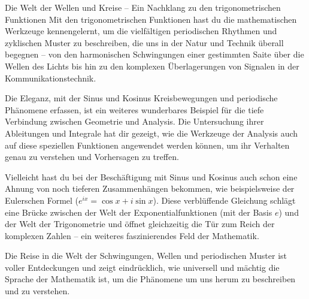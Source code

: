 \begin{infoboxumgebung}{Die Welt der Wellen und Kreise – Ein Nachklang zu den trigonometrischen Funktionen}
Mit den trigonometrischen Funktionen hast du die mathematischen Werkzeuge kennengelernt, um die vielfältigen periodischen Rhythmen und zyklischen Muster zu beschreiben, die uns in der Natur und Technik überall begegnen – von den harmonischen Schwingungen einer gestimmten Saite über die Wellen des Lichts bis hin zu den komplexen Überlagerungen von Signalen in der Kommunikationstechnik.

Die Eleganz, mit der Sinus und Kosinus Kreisbewegungen und periodische Phänomene erfassen, ist ein weiteres wunderbares Beispiel für die tiefe Verbindung zwischen Geometrie und Analysis. Die Untersuchung ihrer Ableitungen und Integrale hat dir gezeigt, wie die Werkzeuge der Analysis auch auf diese speziellen Funktionen angewendet werden können, um ihr Verhalten genau zu verstehen und Vorhersagen zu treffen.

Vielleicht hast du bei der Beschäftigung mit Sinus und Kosinus auch schon eine Ahnung von noch tieferen Zusammenhängen bekommen, wie beispielsweise der Eulerschen Formel ($e^{ix} = \cos x + i \sin x$). Diese verblüffende Gleichung schlägt eine Brücke zwischen der Welt der Exponentialfunktionen (mit der Basis $e$) und der Welt der Trigonometrie und öffnet gleichzeitig die Tür zum Reich der komplexen Zahlen – ein weiteres faszinierendes Feld der Mathematik.

Die Reise in die Welt der Schwingungen, Wellen und periodischen Muster ist voller Entdeckungen und zeigt eindrücklich, wie universell und mächtig die Sprache der Mathematik ist, um die Phänomene um uns herum zu beschreiben und zu verstehen.
\end{infoboxumgebung}




